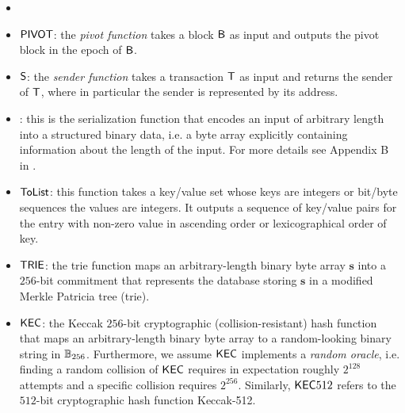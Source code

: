 \begin{itemize}[nosep]
	\item {}


	\item $\mathsf{PIVOT}$: the \emph{pivot function} takes a block $\textsf{B}$ as input and outputs the pivot block in the epoch of $\textsf{B}$.

	\item $\mathsf{S} $: the \emph{sender function} takes a transaction $\textsf{T}$ as input and returns the sender of $\textsf{T}$, where in particular the sender is represented by its address. 

	\item {}: this is the serialization function that encodes an input of arbitrary length into a structured binary data, i.e. a byte array explicitly containing information about the length of the input.
	For more details see Appendix B in \cite{ETH_yellow}.

	\item $\mathsf{ToList}$: this function takes a key/value set whose keys are integers or bit/byte sequences the values are integers. It outputs a sequence of key/value pairs for the entry with non-zero value in ascending order or lexicographical order of key.


	\item $\mathsf{TRIE}$: the trie function maps an arbitrary-length binary byte array $\mathbf{s}$ into a  $256$-bit commitment that represents the database storing $\mathbf{s}$ in a modified Merkle Patricia tree (trie). 

	\item $\mathsf{KEC}$: the Keccak $256$-bit cryptographic (collision-resistant) hash function that maps an arbitrary-length binary byte array to a random-looking binary string in $\mathbb{B}_{256}$.
	Furthermore, we assume $\mathsf{KEC}$ implements a \emph{random oracle}, i.e. finding a random collision of $\mathsf{KEC}$ requires in expectation roughly $2^{128}$ attempts and a specific collision requires $2^{256}$.
	Similarly, $\mathsf{KEC}512$ refers to the $512$-bit cryptographic hash function Keccak-512.


\end{itemize}
